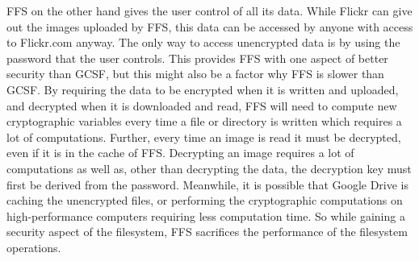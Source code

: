 \gls{FFS} on the other hand gives the user control of all its data. While Flickr can give out the images uploaded by \gls{FFS}, this data can be accessed by anyone with access to Flickr.com anyway. The only way to access unencrypted data is by using the password that the user controls. This provides \gls{FFS} with one aspect of better security than \gls{GCSF}, but this might also be a factor why \gls{FFS} is slower than \gls{GCSF}. By requiring the data to be encrypted when it is written and uploaded, and decrypted when it is downloaded and read, \gls{FFS} will need to compute new cryptographic variables every time a file or directory is written which requires a lot of computations. Further, every time an image is read it must be decrypted, even if it is in the cache of \gls{FFS}. Decrypting an image requires a lot of computations as well as, other than decrypting the data, the decryption key must first be derived from the password. Meanwhile, it is possible that Google Drive is caching the unencrypted files, or performing the cryptographic computations on \mbox{high-performance} computers requiring less computation time. So while gaining a security aspect of the filesystem, \gls{FFS} sacrifices the performance of the filesystem operations.

